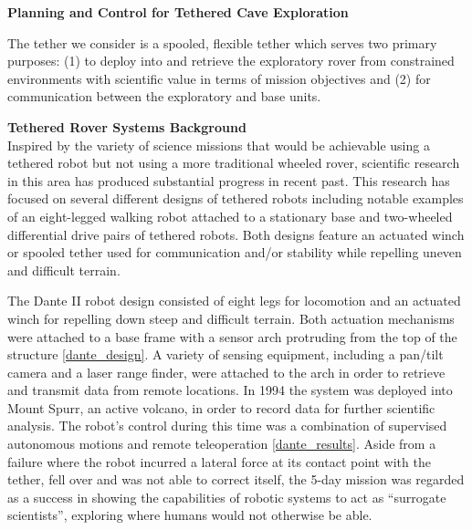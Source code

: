 \documentclass[12pt]{article}
\begin{document}
\newpage

\begin{center}
{\bf Planning and Control for Tethered Cave Exploration }

\end{center}


The tether we consider is a spooled, flexible tether which serves two primary purposes: (1) to deploy into and retrieve the exploratory rover from constrained environments with scientific value in terms of mission objectives and (2) for communication between the exploratory and base units.


{\bf Tethered Rover Systems Background \\}
Inspired by the variety of science missions that would be achievable
using a tethered robot but not using a more traditional wheeled rover, 
scientific research in this area has produced substantial progress in 
recent past. This research has focused on several different designs of
tethered robots including notable examples of an eight-legged walking robot attached to a 
stationary base and two-wheeled differential drive pairs of tethered robots. Both designs
feature an actuated winch or spooled tether used for communication and/or 
stability while repelling uneven and difficult terrain.

The Dante II robot design consisted of eight legs for locomotion and an 
actuated winch for repelling down steep and difficult terrain. Both actuation 
mechanisms were attached to 
a base frame with a sensor arch protruding from the top of the structure \ref{dante_design}. A variety of
sensing equipment, including a pan/tilt camera and a laser range finder,
 were attached to the arch in order to retrieve and transmit data from remote
 locations. In 1994 the system was deployed into Mount Spurr, an active volcano, 
 in order to record data for further scientific analysis. The robot's control 
 during this time was a combination of supervised autonomous motions and remote
 teleoperation \ref{dante_results}. Aside from a failure where the robot incurred a lateral force at its contact
point with the tether, fell over and was not able to correct itself,
 the 5-day mission was regarded as a success in showing the capabilities of robotic
 systems to act as ``surrogate scientists'', exploring where humans would not otherwise
 be able. 
\end{document}
